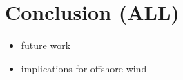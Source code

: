 \documentclass{article}
\begin{document}
\clearpage

\section{Conclusion (ALL)}
\label{sec:experiment}

\begin{itemize}
    \item future work
    \item implications for offshore wind
\end{itemize}

\clearpage








\end{document}
